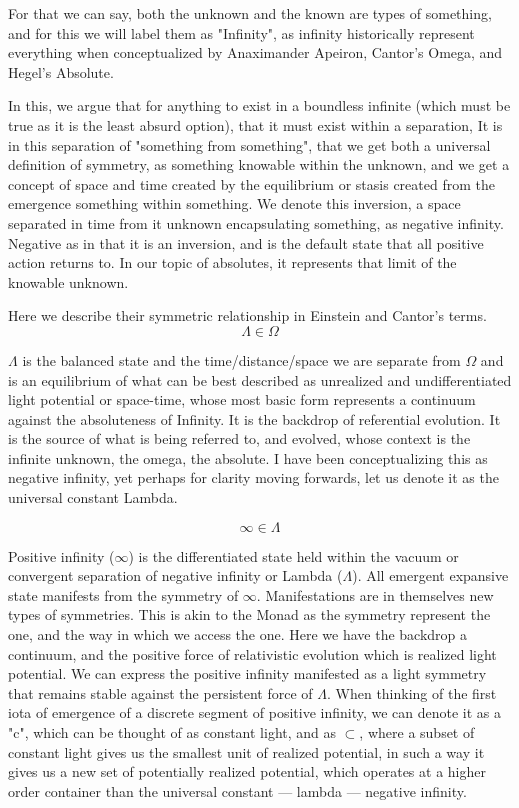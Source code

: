 \documentclass[11pt]{article}
\begin{document}
For that we can say, both the unknown and the known are types of something, and for this we will label them as "Infinity", as infinity historically represent everything when conceptualized by Anaximander Apeiron, Cantor's Omega, and Hegel's Absolute.

In this, we argue that for anything to exist in a boundless infinite (which must be true as it is the least absurd option), that it must exist within a separation, It is in this separation of "something from something", that we get both a universal definition of symmetry, as something knowable within the unknown, and we get a concept of space and time created by the equilibrium or stasis created from the emergence something within something. We denote this inversion, a space separated in time from it unknown encapsulating something, as negative infinity. Negative as in that it is an inversion, and is the default state that all positive action returns to. In our topic of absolutes, it represents that limit of the knowable unknown.

Here we describe their symmetric relationship in Einstein and Cantor's terms.
\[ 
    \Lambda \in \Omega
\]

\( \Lambda \) is the balanced state and the time/distance/space we are separate from \( \Omega\) and is an equilibrium of what can be best described as unrealized and undifferentiated light potential or space-time, whose most basic form represents a continuum against the absoluteness of Infinity. It is the backdrop of referential evolution. It is the source of what is being referred to, and evolved, whose context is the infinite unknown, the omega, the absolute. I have been conceptualizing this as negative infinity, yet perhaps for clarity moving forwards, let us denote it as the universal constant Lambda.

\[     
    \infty \in \Lambda
\]

Positive infinity (\( \infty\)) is the differentiated state held within the vacuum or convergent separation of negative infinity or Lambda (\( \Lambda\)). All emergent expansive state manifests from the symmetry of \( \infty\). Manifestations are in themselves new types of symmetries. This is akin to the Monad as the symmetry represent the one, and the way in which we access the one. Here we have the backdrop a continuum, and the positive force of relativistic evolution which is realized light potential. We can express the positive infinity manifested as a light symmetry that remains stable against the persistent force of \( \Lambda \). When thinking of the first iota of emergence of a discrete segment of positive infinity, we can denote it as a "c", which can be thought of as constant light, and as \( \subset \), where a subset of constant light gives us the smallest unit of realized potential, in such a way it gives us a new set of potentially realized potential, which operates at a higher order container than the universal constant --- lambda --- negative infinity. 
\end{document}
